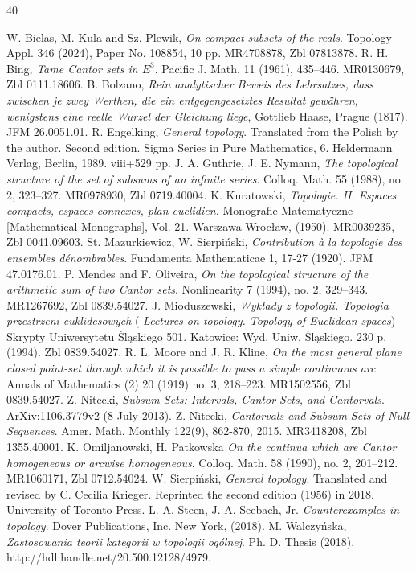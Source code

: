 \documentclass[12pt,a4paper,leqno]{amsart}
\theoremstyle{definition}
\begin{document}
\begin{thebibliography}{40}


    W. Bielas, M. Kula and Sz. Plewik, \textit{On compact subsets of the reals}. Topology Appl. 346 (2024), Paper No. 108854, 10 pp. 
MR4708878,  Zbl 07813878.
 R. H. Bing,  \textit{Tame Cantor sets in $E^3$}. Pacific J. Math. 11 (1961), 435–446. MR0130679,   Zbl 0111.18606.
    B. Bolzano, \textit{Rein analytischer Beweis des Lehrsatzes, dass zwischen je zwey Werthen, die ein entgegengesetztes Resultat gewähren, wenigstens eine reelle Wurzel der Gleichung liege}, Gottlieb Haase, Prague (1817).    JFM 26.0051.01. 
    R. Engelking, \textit{General topology}. Translated from the Polish by the author. Second edition. Sigma Series in Pure Mathematics, 6. Heldermann Verlag, Berlin, 1989. viii+529 pp. 
    J. A. Guthrie, J. E. Nymann, \textit{The topological structure of the set of subsums of an infinite series}. Colloq. Math. 55 (1988), no. 2, 323--327. 
MR0978930, Zbl 0719.40004.
		 K. Kuratowski, 
\textit{Topologie. II. Espaces compacts, espaces connexes, plan euclidien.} 
Monografie Matematyczne [Mathematical Monographs], Vol. 21.  Warszawa-Wrocław, (1950). 
MR0039235, Zbl 0041.09603.
	   St. Mazurkiewicz, W. Sierpi\'nski, 
\textit{Contribution \`a la topologie des ensembles d\'enombrables}. 
Fundamenta Mathematicae 1, 17-27 (1920). JFM 47.0176.01.
	  P. Mendes and F. Oliveira,  \textit{On the topological structure of the arithmetic sum of two Cantor sets}. Nonlinearity 7 (1994), no. 2, 329--343. MR1267692, 	Zbl 0839.54027.
   J. Mioduszewski, \textit{Wykłady z topologii. Topologia przestrzeni euklidesowych} ( \textit{Lectures on topology. Topology of Euclidean spaces})
Skrypty Uniwersytetu Śląskiego 501. Katowice: Wyd. Uniw. Śląskiego. 230 p. (1994). Zbl 0839.54027.
    R. L. Moore and J. R. Kline, \textit{On the most general plane closed point-set through which it is possible to pass a simple continuous arc}. Annals of Mathematics (2) 20 (1919) no. 3,  218--223. MR1502556, Zbl 0839.54027.
    Z. Nitecki, \textit{Subsum Sets: Intervals, Cantor Sets, and Cantorvals}. ArXiv:1106.3779v2 (8 July 2013).
    Z. Nitecki, \textit{Cantorvals and Subsum Sets of Null Sequences}. Amer. Math. Monthly 122(9), 862-870, 2015. MR3418208, Zbl 1355.40001.
	 K. Omiljanowski, H. Patkowska \textit{On the continua which are Cantor homogeneous or arcwise homogeneous}. Colloq. Math. 58 (1990), no. 2, 201--212. MR1060171, Zbl 0712.54024.
	  W.  Sierpi\'{n}ski,  \textit{General topology}. Translated and revised by C. Cecilia Krieger.  Reprinted the second edition (1956) in 2018. University of Toronto Press. 
    L. A. Steen, J. A. Seebach,  Jr. \textit{Counterexamples in topology}.  Dover Publications, Inc. New York, (2018). 
      M. Walczy\'nska, \textit{Zastosowania teorii kategorii w topologii og\'olnej}. Ph. D. Thesis (2018), http://hdl.handle.net/20.500.12128/4979.
\end{thebibliography}
\end{document}
